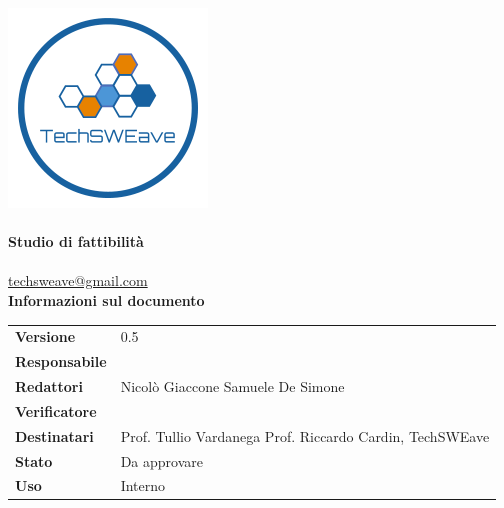 \documentclass[a4paper]{article}
\begin{document}
\begin{titlepage}
    \begin{center}
        \includegraphics{../../../Images/logo}\\
        \vspace{20px}
        \textcolor{logo}{\hrulefill}\\
        \vspace{20px}
        \textbf{\huge\textcolor{logo}{Studio di fattibilità}}\\
        \vspace{10px}
        \textcolor{logo}{\hrulefill}\\
        \vspace{20px}
        \href{mailto:techsweave@gmail.com}{techsweave@gmail.com}\\
        \vspace{40px}
        \textbf{\Large Informazioni sul documento}\\
        \vspace{20px}
        \begin{tabular}{p{100px} | p{100px}}
            \textbf{Versione} & 0.5\\
            \textbf{Responsabile} & \\
            \textbf{Redattori} & Nicolò Giaccone \newline Samuele De Simone\\
            \textbf{Verificatore} & \\
            \textbf{Destinatari} & Prof. Tullio Vardanega \newline Prof. Riccardo Cardin, \newline TechSWEave\\
            \textbf{Stato} & Da approvare\\
            \textbf{Uso} & Interno\\
        \end{tabular}

    \end{center}
    \end{titlepage}
\end{document}

